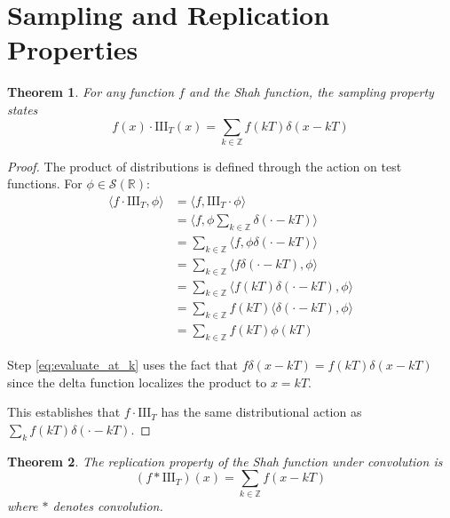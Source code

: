 \documentclass{article}
\newtheorem{theorem}{Theorem}
\begin{document}
\section{Sampling and Replication Properties}

\begin{theorem}
\label{thm:sampling_property}
For any function $f$ and the Shah function, the sampling property states
\begin{equation}
\label{eq:sampling}
f(x) \cdot \text{III}_T(x) = \sum_{k \in \mathbb{Z}} f(kT) \delta(x - kT)
\end{equation}
\end{theorem}

\begin{proof}
The product of distributions is defined through the action on test functions. For $\phi \in \mathcal{S}(\mathbb{R})$:
\begin{align}
\langle f \cdot \text{III}_T, \phi \rangle &= \langle f, \text{III}_T \cdot \phi \rangle \label{eq:product_definition}\\
&= \langle f, \phi \sum_{k \in \mathbb{Z}} \delta(\cdot - kT) \rangle \label{eq:shah_expand}\\
&= \sum_{k \in \mathbb{Z}} \langle f, \phi \delta(\cdot - kT) \rangle \label{eq:distribute_sum}\\
&= \sum_{k \in \mathbb{Z}} \langle f \delta(\cdot - kT), \phi \rangle \label{eq:product_delta}\\
&= \sum_{k \in \mathbb{Z}} \langle f(kT) \delta(\cdot - kT), \phi \rangle \label{eq:evaluate_at_k}\\
&= \sum_{k \in \mathbb{Z}} f(kT) \langle \delta(\cdot - kT), \phi \rangle \label{eq:factor_constant}\\
&= \sum_{k \in \mathbb{Z}} f(kT) \phi(kT) \label{eq:delta_action}
\end{align}

Step \eqref{eq:evaluate_at_k} uses the fact that $f \delta(x - kT) = f(kT) \delta(x - kT)$ since the delta function localizes the product to $x = kT$.

This establishes that $f \cdot \text{III}_T$ has the same distributional action as $\sum_{k} f(kT) \delta(\cdot - kT)$.
\end{proof}

\begin{theorem}
\label{thm:replication_property}
The replication property of the Shah function under convolution is
\begin{equation}
\label{eq:replication}
(f * \text{III}_T)(x) = \sum_{k \in \mathbb{Z}} f(x - kT)
\end{equation}
where $*$ denotes convolution.
\end{theorem}
\end{document}
